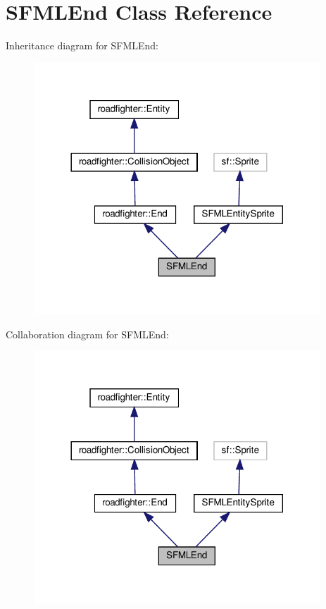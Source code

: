 \hypertarget{classSFMLEnd}{}\section{S\+F\+M\+L\+End Class Reference}
\label{classSFMLEnd}


Inheritance diagram for S\+F\+M\+L\+End\+:\nopagebreak
\begin{figure}[H]
\begin{center}
\leavevmode
\includegraphics[width=305pt]{classSFMLEnd__inherit__graph}
\end{center}
\end{figure}


Collaboration diagram for S\+F\+M\+L\+End\+:\nopagebreak
\begin{figure}[H]
\begin{center}
\leavevmode
\includegraphics[width=305pt]{classSFMLEnd__coll__graph}
\end{center}
\end{figure}
